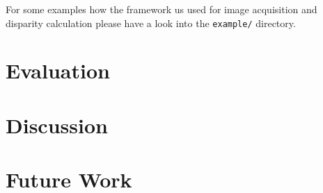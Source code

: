\documentclass[11pt]{article}
\begin{document}
\bigskip
For some examples how the framework us used for image acquisition and disparity calculation please have a look into the \texttt{example/} directory. %


\section{Evaluation}
\section{Discussion}
\section{Future Work}

\nocite{*}


\end{document}
